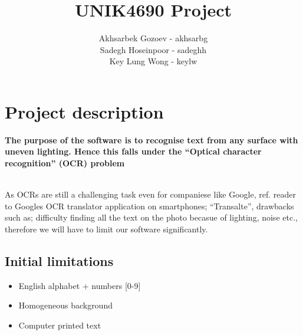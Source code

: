 \documentclass[11pt,a4paper,english]{article}
\title{UNIK4690 Project}
\author{
  Akhsarbek Gozoev  - akhsarbg \\
  Sadegh Hoseinpoor - sadeghh\\
  Key Lung Wong - keylw
}
\begin{document}
\maketitle
\section{Project description}
\textbf{The purpose of the software is to recognise text from any
surface with uneven lighting. Hence this falls under the ``Optical character recognition'' (OCR) problem}

\noindent \\ As OCRs are still a challenging task even for companiese like
Google, ref. reader to Googles OCR translator application on smartphones;
``Transalte'', drawbacks such as; difficulty finding all the text on the photo
becasue of lighting, noise etc., therefore we will have to limit our software
significantly.

\subsection{Initial limitations}
\begin{itemize}
 \item{English alphabet + numbers [0-9]}
 \item{Homogeneous background}
 \item{Computer printed text}
\end{itemize}
\end{document}
